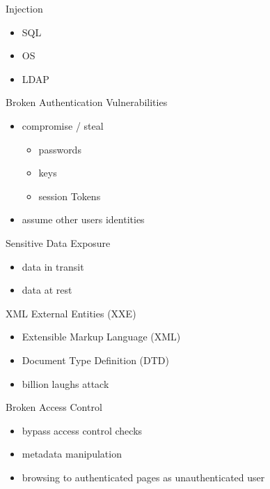 \documentclass{curs}
\begin{document}
\begin{frame}{Injection}
  \begin{itemize}
    \item SQL 
    \item OS
    \item LDAP
  \end{itemize}
\end{frame}

\begin{frame}{Broken Authentication Vulnerabilities}
  \begin{itemize}
    \item compromise / steal
      \begin{itemize}
        \item passwords
        \item keys
        \item session Tokens
      \end{itemize}
    \item assume other users identities
  \end{itemize}
\end{frame}

\begin{frame}{Sensitive Data Exposure}
  \begin{itemize}
    \item data in transit
    \item data at rest
  \end{itemize}
\end{frame}

\begin{frame}{XML External Entities (XXE)}
  \begin{itemize}
    \item Extensible Markup Language (XML)
    \item Document Type Definition (DTD)
    \item billion laughs attack
  \end{itemize}
\end{frame}

\begin{frame}{Broken Access Control}
  \begin{itemize}
    \item bypass access control checks
    \item metadata manipulation
    \item browsing to authenticated pages as unauthenticated user
  \end{itemize}
\end{frame}
\end{document}
